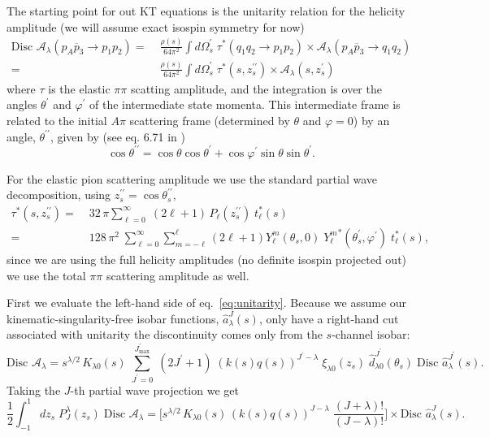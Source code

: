 \documentclass[10pt, aps,prd,amsmath,amssymb,superscriptaddress,onecolumn,
nofootinbib,showpacs,preprintnumbers]{revtex4-1}
\newcommand{\jpmax}{{J^\prime_\text{max}}}
\newcommand{\Disc}{\text{Disc }}
\begin{document}
The starting point for out KT equations is the unitarity relation for the helicity amplitude (we will assume exact isospin symmetry for now)
  \begin{align}
    \label{eq:unitarity}
    \Disc \mathcal{A}_\lambda(p_A \overline{p}_3 \to p_1 p_2 ) =&\; \frac{\rho(s)}{64 \pi^2} \int d\Omega_s^\prime  \; \tau^*(q_1q_2 \to p_1p_2) \times \mathcal{A}_\lambda(p_A \overline{p}_{3} \to q_1 q_2 ) \nonumber \\
    =& \; \frac{\rho(s)}{64 \pi^2} \int d\Omega_s^\prime  \; \tau^*(s,z_s^{\prime\prime}) \times \mathcal{A}_\lambda(s,z_s^{\prime})
  \end{align}
where \(\tau\) is the elastic \(\pi\pi\) scatting amplitude, and the integration is over the angles \(\theta^\prime\) and \(\varphi^\prime\) of the intermediate state momenta. This intermediate frame is related to the initial \(A\pi\) scattering frame (determined by \(\theta\) and \(\varphi = 0\)) by an angle, \(\theta^{\prime\prime}\), given by (see eq. 6.71 in \cite{MS})
  \begin{equation}
    \cos \theta^{\prime\prime} = \cos \theta \cos \theta^\prime + \cos \varphi^\prime \sin\theta \sin \theta^\prime.
  \end{equation}

For the elastic pion scattering amplitude we use the standard partial wave decomposition, using \( z_s^{\prime\prime} = \cos \theta_s^{\prime\prime}\),
  \begin{align}
    \label{eq:elastic-pion}
    \tau^*(s, z_s^{\prime\prime}) =& \; 32 \, \pi \sum_{\ell=0  }^\infty \; (2\ell+1) \, P_{\ell}(z_s^{\prime\prime}) \; t_\ell^*(s) \nonumber \\
    =& \; 128 \, \pi^2 \; \sum_{\ell=0}^\infty \sum_{m=-\ell}^{\ell} (2\ell +1 ) Y^m_\ell(\theta_s,0) \; {Y^m_\ell}^*(\theta_s^\prime, \varphi^\prime) \; t_\ell^*(s),
  \end{align}
since we are using the full helicity amplitudes (no definite isospin projected out) we use the total \(\pi\pi\) scattering amplitude as well.

First we evaluate the left-hand side of eq.~\ref{eq:unitarity}. Because we assume our kinematic-singularity-free isobar functions, \(\hat{a}_\lambda^J(s)\), only have a right-hand cut associated with unitarity the discontinuity comes only from the \(s\)-channel isobar:
  \begin{equation}
    \label{eq:discontinuity}
    \Disc \mathcal{A}_\lambda = s^{\lambda/2}\, K_{\lambda 0}(s) \; \sum_{J^\prime=0}^\jpmax \; (2 J^\prime +1) \; (k(s)q(s))^{J^\prime-\lambda}  \; \xi_{\lambda 0}(z_s)
    \; \hat{d}^{J^\prime}_{\lambda 0}(\theta_s) \; \Disc \hat{a}_\lambda^{J^\prime}(s).
  \end{equation}
Taking the \(J\)-th partial wave projection we get
  \begin{equation}
    \label{eq:pw-disc}
    \frac{1}{2} \int_{-1}^1 dz_s \; P^\lambda_{J}(z_s) \; \Disc \mathcal{A}_\lambda =
    \bigg[ s^{\lambda/2} \, K_{\lambda 0}(s) \, (k(s)q(s))^{J-\lambda} \; \frac{(J+\lambda)!}{(J-
    \lambda)!} \bigg] \times \Disc \hat{a}^J_\lambda(s).
  \end{equation}
\end{document}
